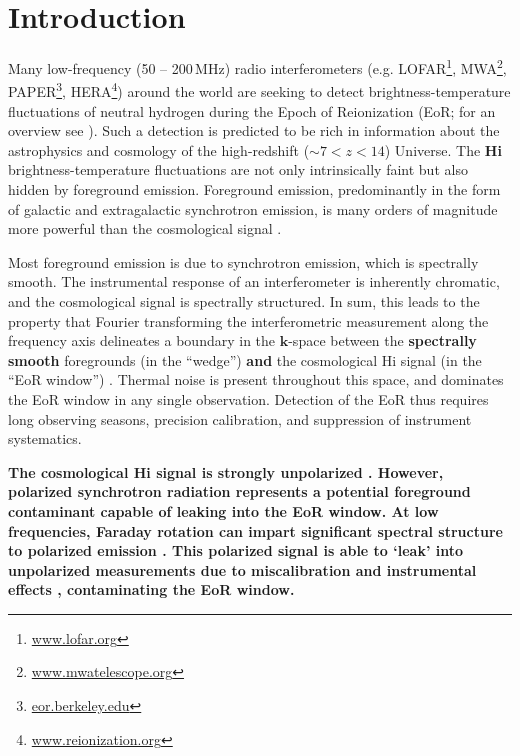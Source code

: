 \documentclass[twocolumn, trackchanges]{aastex61}
\newcommand{\edited}[1]{{\bf \color{blue} #1}}
\begin{document}

\section{Introduction}
\label{sec:intro}

Many low-frequency (50 -- 200\,MHz) radio interferometers (e.g. LOFAR\footnote{\url{www.lofar.org}}, MWA\footnote{\url{www.mwatelescope.org}}, PAPER\footnote{\url{eor.berkeley.edu}}, HERA\footnote{\url{www.reionization.org}}) around the world are seeking to detect brightness-temperature fluctuations of neutral hydrogen during the Epoch of Reionization (EoR; for an overview see \citet{Furlanetto06}). 
Such a detection is predicted to be rich in information about the astrophysics and cosmology of the high-redshift ($\sim 7 < z < 14$) Universe.
The \edited{{\sc Hi}} brightness-temperature fluctuations are not only intrinsically faint but also hidden by foreground emission. Foreground emission, predominantly in the form of galactic and extragalactic synchrotron emission, is many orders of magnitude more powerful than the cosmological signal \citep[e.g.][]{Bernardi09, Pober13, Dillon14}.

Most foreground emission is due to synchrotron emission, which is spectrally smooth. The instrumental response of an interferometer is inherently chromatic, and the cosmological signal is spectrally structured. In sum, this leads to the property that Fourier transforming the interferometric measurement along the frequency axis delineates a boundary in the $\mathbf{k}$-space between the \edited{spectrally smooth}
foregrounds (in the ``wedge'') \edited{and} the cosmological {\sc Hi} signal (in the ``EoR window'')
\citep{Datta.10, Morales.12, Parsons.12a, Parsons.12b, Trott.12, Vedantham.12, Pober13, Thyagarajan.13, Pober.14, Liu.14a, Liu.14b, Dillon.15a, Dillon.15b, Nithya.15b, Nithya.15a}.
Thermal noise is present throughout this space, and dominates the EoR window in any single observation.
Detection of the EoR thus requires long observing seasons, precision calibration, and suppression of instrument systematics. 

\edited{The cosmological {\sc Hi} signal is strongly unpolarized \citep{Mishra.17}. However, polarized synchrotron radiation represents a potential foreground contaminant capable of leaking into the EoR window. At low frequencies, Faraday rotation can impart significant spectral structure to polarized emission \citep[e.g.][]{Moore13}. This polarized signal is able to `leak' into unpolarized measurements due to miscalibration and instrumental effects \citep{Carozzi.09, Geil.11, Moore13, Asad15, Asad.16, Kohn16, Nunhokee.17}, contaminating the EoR window.} 
\end{document}
